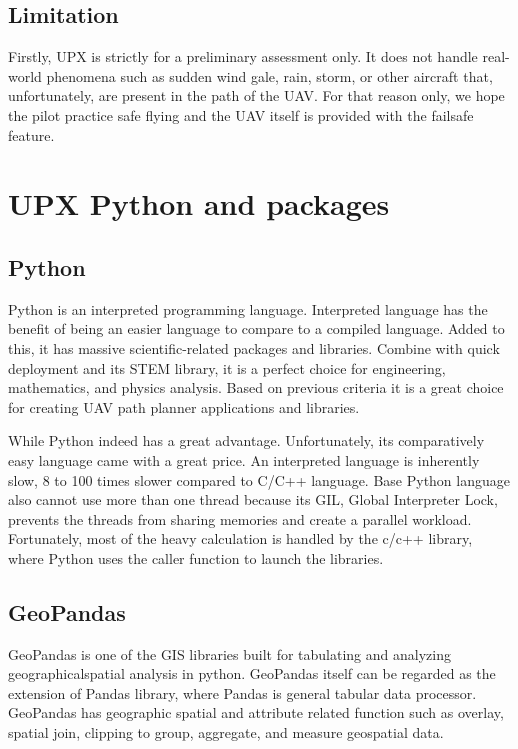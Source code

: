 \documentclass[12pt]{report}
\begin{document}
        \subsection{Limitation}
        Firstly, UPX is strictly for a preliminary assessment only. It does not handle real-world phenomena such as
        sudden wind gale, rain, storm, or other aircraft that, unfortunately, are present in the path of the UAV. For
        that reason only, we hope the pilot practice safe flying and the UAV itself is provided with the failsafe
        feature.

    \section{UPX Python and packages}
        \subsection{Python}
        Python is an interpreted programming language. Interpreted language has the benefit of being an easier language
        to compare to a compiled language. Added to this, it has massive scientific-related packages and libraries.
        Combine with quick deployment and its STEM library, it is a perfect choice for engineering, mathematics, and
        physics analysis. Based on previous criteria it is a great choice for creating UAV path planner applications and
        libraries.
            
        While Python indeed has a great advantage. Unfortunately, its comparatively easy language came with a great
        price. An interpreted language is inherently slow, 8 to 100 times slower compared to C/C++ language. Base Python
        language also cannot use more than one thread because its GIL, Global Interpreter Lock, prevents the threads
        from sharing memories and create a parallel workload. Fortunately, most of the heavy calculation is handled by
        the c/c++ library, where Python uses the caller function to launch the libraries.

        \subsection{GeoPandas}
        GeoPandas is one of the GIS libraries built for tabulating and analyzing geographicalspatial analysis in python.
        GeoPandas itself can be regarded as the extension of Pandas library, where Pandas is general tabular data
        processor. GeoPandas has geographic spatial and attribute related function such as overlay, spatial join,
        clipping to group, aggregate, and measure geospatial data.
            
\end{document}
